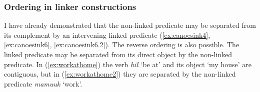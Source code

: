 \begin{comment}
ACTUALLY*2: This works quite well for showing a deictic predicate. Unfortunately it is XL so I cannot use it. Oh well!

ACTUALLY! I think the below is wrong. If you look at XL's sentence, the predicate is deictic ʔaḥʔaa, to which the linker still attaches! This would mean the only counterexample would be Adv V+link. Investigate this further.

But occasionally the linker may occur on the sole predicate in a sentence. This appears to contradict examples (\ref{ex:someonespoke}) and (\ref{ex:*someonespoke}), but the translation provided for these ``dangling" linkers always indicates they are notionally attached to the preceding sentence. I have 1 (TODO: look for more, update number) example from my corpus, involving the word \textit{qʷis} `do so'.\footnote{I am not here counting examples from \textit{tupaat} Julia Lucas, who is unique in always uses the the conjunction \textit{ʔunʔuuƛ} with a linker attached. I believe she has a different lexical entry for the word, and will explain in section (TODO).} I give one example below:

TODO, this is from Charlie Lucas, who I do not have permissions to share. Update it with a sharable example.

Context: \textit{łačiƛni wa. ʔuušciłʔap̓aƛukni nunuuk. ʔuušciłʔap̓aƛukni huyaał.} `We've let it go, haven't we? It has become hard for us to sing. It has become hard for us to dance.'

\ex \label{ex:danglinglinker}
\begingl
\glpreamble ʔaḥʔaa qʷisḥnii.//
\gla ʔaḥʔaa qʷis-(q)ḥ=niˑ //
\glb DDYN do.so-\textsc{link}=\textsc{neut.1pl} //
\glft `That's what happened to us.' //
\endgl
\xe

Although the one predicate is 

\end{comment}

\subsubsection{Ordering in linker constructions} \label{sec:link:participants}

I have already demonstrated that the non-linked predicate may be separated from its complement by an intervening linked predicate (\ref{ex:canoesink4}, \ref{ex:canoesink6}, \ref{ex:canoesink6.2}). The reverse ordering is also possible. The linked predicate may be separated from its direct object by the non-linked predicate. In (\ref{ex:workathome}) the verb \textit{hił} `be at' and its object `my house' are contiguous, but in (\ref{ex:workathome2}) they are separated by the non-linked predicate \textit{mamuuk} `work'.

